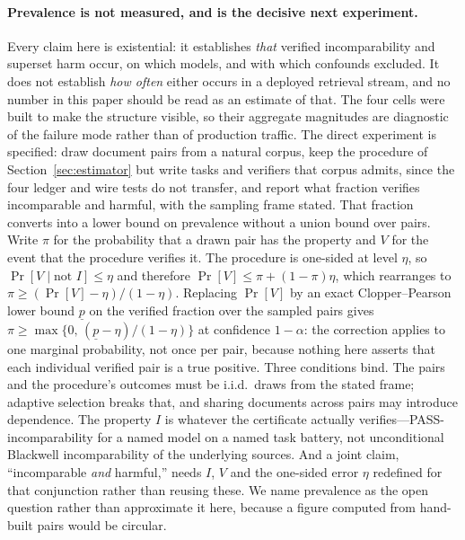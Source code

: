 \documentclass[11pt]{article}
\theoremstyle{plain}
\theoremstyle{definition}
\theoremstyle{remark}
\begin{document}
\paragraph{Prevalence is not measured, and is the decisive next experiment.} Every claim here is
existential: it establishes \emph{that} verified incomparability and superset harm occur, on which
models, and with which confounds excluded. It does not establish \emph{how often} either occurs in
a deployed retrieval stream, and no number in this paper should be read as an estimate of that.
The four cells were built to make the structure visible, so their aggregate magnitudes are
diagnostic of the failure mode rather than of production traffic. The direct experiment is
specified: draw document pairs from a natural corpus, keep the procedure of
Section~\ref{sec:estimator} but write tasks and verifiers that corpus admits, since the four
ledger and wire tests do not transfer, and report what fraction verifies incomparable and
harmful, with the sampling frame stated. That fraction converts into a lower bound on prevalence
without a union bound over pairs. Write $\pi$ for the probability that a drawn pair has the
property and $V$ for the event that the procedure verifies it. The procedure is one-sided at level
$\eta$, so $\Pr[V \mid \text{not } I] \le \eta$ and therefore $\Pr[V] \le \pi + (1-\pi)\eta$,
which rearranges to $\pi \ge (\Pr[V]-\eta)/(1-\eta)$. Replacing $\Pr[V]$ by an exact
Clopper--Pearson lower bound $\underline{p}$ on the verified fraction over the sampled pairs gives
$\pi \ge \max\{0,\,(\underline{p}-\eta)/(1-\eta)\}$ at confidence $1-\alpha$: the correction
applies to one marginal probability, not once per pair, because nothing here asserts that each
individual verified pair is a true positive. Three conditions bind. The pairs and the procedure's
outcomes must be i.i.d.\ draws from the stated frame; adaptive selection breaks that, and
sharing documents across pairs may introduce dependence. The property $I$ is whatever the certificate actually
verifies---PASS-incomparability for a named model on a named task battery, not unconditional
Blackwell incomparability of the underlying sources. And a joint claim, ``incomparable
\emph{and} harmful,'' needs $I$, $V$ and the one-sided error $\eta$ redefined for that conjunction
rather than reusing these. We name prevalence as the open question rather than approximate it
here, because a figure computed from hand-built pairs would be circular.
\end{document}
